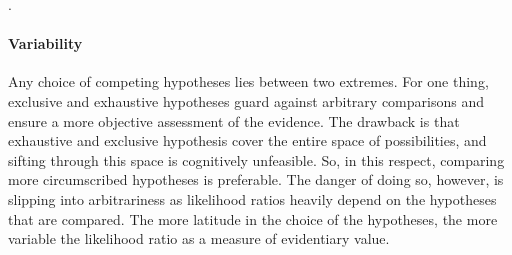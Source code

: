 \documentclass{article}
\begin{document}
\citep{evett2000MoreHierarchyPropositions}. 



\paragraph{Variability}

Any choice of competing hypotheses 
lies between two extremes.
For one thing, exclusive and exhaustive hypotheses guard against arbitrary comparisons and ensure a more objective assessment of the evidence. The drawback is that exhaustive and exclusive hypothesis cover the entire space of possibilities, and sifting through this space is cognitively unfeasible. So, in this respect, comparing more circumscribed hypotheses is preferable. The danger of doing so, however, is slipping into arbitrariness as likelihood ratios heavily depend on the hypotheses that are compared. The more latitude in the choice of the hypotheses,
the more variable the likelihood ratio as a measure of evidentiary value. 
\end{document}

